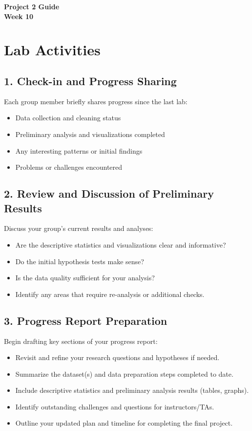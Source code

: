 \documentclass[12pt]{article}
\begin{document}
\begin{center}
\textbf{\Large Project 2 Guide \\ Week 10 } 
\end{center}

\section*{Lab Activities}

\subsection*{1. Check-in and Progress Sharing}
Each group member briefly shares progress since the last lab:  
\begin{itemize}
    \item Data collection and cleaning status  
    \item Preliminary analysis and visualizations completed  
    \item Any interesting patterns or initial findings  
    \item Problems or challenges encountered  
\end{itemize}

\vspace{2\baselineskip}

\subsection*{2. Review and Discussion of Preliminary Results}
Discuss your group's current results and analyses:  
\begin{itemize}
    \item Are the descriptive statistics and visualizations clear and informative?  
    \item Do the initial hypothesis tests make sense?  
    \item Is the data quality sufficient for your analysis?  
    \item Identify any areas that require re-analysis or additional checks.  
\end{itemize}

\vspace{2\baselineskip}

\subsection*{3. Progress Report Preparation}
Begin drafting key sections of your progress report:  
\begin{itemize}
    \item Revisit and refine your research questions and hypotheses if needed.  
    \item Summarize the dataset(s) and data preparation steps completed to date.  
    \item Include descriptive statistics and preliminary analysis results (tables, graphs).  
    \item Identify outstanding challenges and questions for instructors/TAs.  
    \item Outline your updated plan and timeline for completing the final project.  
\end{itemize}
\end{document}
